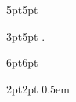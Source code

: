 
{5pt}{5pt}%
{\normalfont}%
{}%
{\bfseries}%
{}%
{\newline}%
{}%

{3pt}{5pt}%
{\itshape}%
{}%
{\bfseries}%
{.}%
{ }%
{}%

{6pt}{6pt}%
{\itshape}%
{}%
{\scshape}%
{ — }%
{ }%
{}%

{2pt}{2pt}%
{\normalfont}{}%
{\bfseries}{}%
{0.5em}%
{}%

\makeatletter
\renewenvironment{proof}[1][\proofname]{%
  \par\pushQED{\qed}\normalfont
  \topsep6\p@\@plus6\p@\relax
  \trivlist
  \item[\hskip\labelsep\bfseries #1.]%
}{
  \popQED\endtrivlist\@endpefalse
}
\makeatother